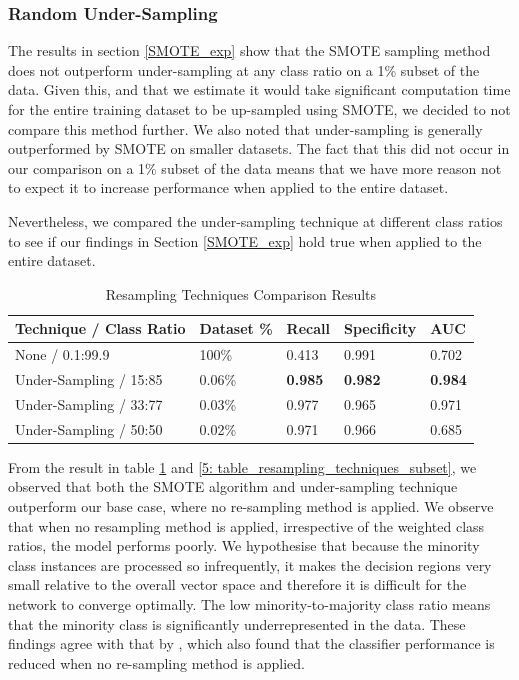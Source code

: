         \subsubsection{Random Under-Sampling} \label{random_under_sampling}
        The results in section \ref{SMOTE_exp} show that the SMOTE sampling method does not outperform under-sampling at any class ratio on a 1\% subset of the data. Given this, and that we estimate it would take significant computation time for the entire training dataset to be up-sampled using SMOTE, we decided to not compare this method further. We also noted that under-sampling is generally outperformed by SMOTE on smaller datasets. The fact that this did not occur in our comparison on a 1\% subset of the data means that we have more reason not to expect it to increase performance when applied to the entire dataset.   
        
        Nevertheless, we compared the under-sampling technique at different class ratios to see if our findings in Section \ref{SMOTE_exp} hold true when applied to the entire dataset. 

        \begin{table}[H]
            \centering
            \caption{Resampling Techniques Comparison Results} \vspace{0.5cm}
            \label{5: table_resampling_techniques}
                \begin{tabular}{|p{5cm}|p{2.25cm}|p{1.75cm}|p{2cm}|p{2cm}|}
                    \hline \textbf{Technique / Class Ratio} &  \textbf{Dataset \%} & \textbf{Recall} & \textbf{Specificity} & \textbf{AUC} \\ \hline \hline
                    None / 0.1:99.9 & 100\% & 0.413 & 0.991  & 0.702 \\ \hline
                    Under-Sampling / 15:85 & 0.06\% & \textbf{0.985} & \textbf{0.982}  & \textbf{0.984} \\ \hline
                    Under-Sampling / 33:77 & 0.03\% & 0.977 & 0.965  & 0.971 \\ \hline
                    Under-Sampling / 50:50 & 0.02\% & 0.971 & 0.966  & 0.685 \\ \hline
                \end{tabular}
        \end{table}
        
        From the result in table \ref{5: table_resampling_techniques} and \ref{5: table_resampling_techniques_subset}, we observed that both the SMOTE algorithm and under-sampling technique outperform our base case, where no re-sampling method is applied. We observe that when no resampling method is applied, irrespective of the weighted class ratios, the model performs poorly. We hypothesise that because the minority class instances are processed so infrequently, it makes the decision regions very small relative to the overall vector space and therefore it is difficult for the network to converge optimally. The low minority-to-majority class ratio means that the minority class is significantly underrepresented in the data. These findings agree with that by \cite{training_CNN}, which also found that the classifier performance is reduced when no re-sampling method is applied.    
        
